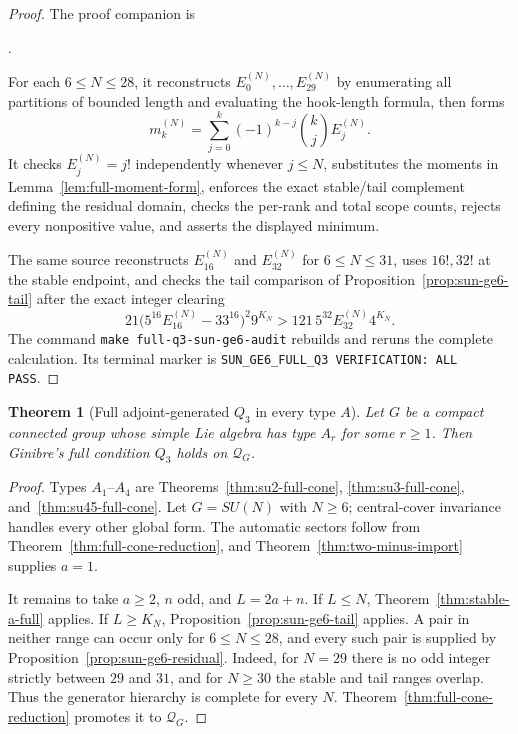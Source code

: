\documentclass[11pt,reqno]{amsart}
\theoremstyle{plain}
\newtheorem{theorem}{Theorem}[section]
\theoremstyle{definition}
\newcommand{\Qcone}{\mathcal Q}
\begin{document}
\begin{proof}
The proof companion is
\begin{center}
.
\end{center}
For each $6\leq N\leq28$, it reconstructs
$E_0^{(N)},\ldots,E_{29}^{(N)}$ by enumerating all partitions of bounded
length and evaluating the hook-length formula, then forms
\[
 m_k^{(N)}=\sum_{j=0}^k(-1)^{k-j}\binom kjE_j^{(N)}.
\]
It checks $E_j^{(N)}=j!$ independently whenever $j\leq N$, substitutes the
moments in Lemma~\ref{lem:full-moment-form}, enforces the exact stable/tail
complement defining the residual domain, checks the per-rank and total scope
counts, rejects every nonpositive value, and asserts the displayed minimum.

The same source reconstructs $E_{16}^{(N)}$ and $E_{32}^{(N)}$ for
$6\leq N\leq31$, uses $16!,32!$ at the stable endpoint, and checks the
tail comparison of Proposition~\ref{prop:sun-ge6-tail} after the exact
integer clearing
\[
 21\bigl(5^{16}E_{16}^{(N)}-33^{16}\bigr)^2 9^{K_N}
 >121\,5^{32}E_{32}^{(N)}4^{K_N}.
\]
The command \texttt{make full-q3-sun-ge6-audit} rebuilds and reruns the
complete calculation.  Its terminal marker is
\texttt{SUN\_GE6\_FULL\_Q3 VERIFICATION: ALL PASS}.
\end{proof}

\begin{theorem}[Full adjoint-generated $Q_3$ in every type $A$]
\label{thm:type-a-full-cone}
Let $G$ be a compact connected group whose simple Lie algebra has type
$A_r$ for some $r\geq1$.  Then Ginibre's full condition $Q_3$ holds on
$\Qcone_G$.
\end{theorem}

\begin{proof}
Types $A_1$--$A_4$ are Theorems~\ref{thm:su2-full-cone},
\ref{thm:su3-full-cone}, and~\ref{thm:su45-full-cone}.  Let
$G=SU(N)$ with $N\geq6$; central-cover invariance handles every other global
form.  The automatic sectors follow from
Theorem~\ref{thm:full-cone-reduction}, and
Theorem~\ref{thm:two-minus-import} supplies $a=1$.

It remains to take $a\geq2$, $n$ odd, and $L=2a+n$.  If $L\leq N$,
Theorem~\ref{thm:stable-a-full} applies.  If $L\geq K_N$,
Proposition~\ref{prop:sun-ge6-tail} applies.  A pair in neither range can
occur only for $6\leq N\leq28$, and every such pair is supplied by
Proposition~\ref{prop:sun-ge6-residual}.  Indeed, for $N=29$ there is no odd
integer strictly between $29$ and $31$, and for $N\geq30$ the stable and
tail ranges overlap.  Thus the generator hierarchy is complete for every
$N$.  Theorem~\ref{thm:full-cone-reduction} promotes it to $\Qcone_G$.
\end{proof}
\end{document}

